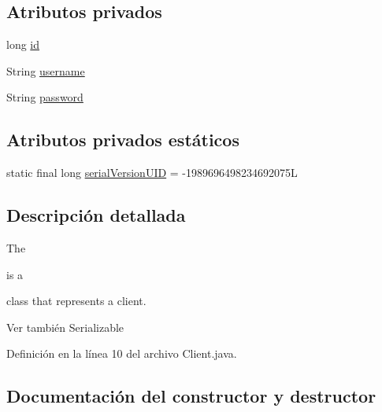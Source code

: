 \subsection*{Atributos privados}
\begin{DoxyCompactItemize}
\item 
long \mbox{\hyperlink{classcom_1_1ruralhousejsf_1_1domain_1_1_client_ab353a203ee0d84148e34fbb27ff0dbb8}{id}}
\item 
String \mbox{\hyperlink{classcom_1_1ruralhousejsf_1_1domain_1_1_client_a0d105bbb8e72c4a5b70ec43f59227882}{username}}
\item 
String \mbox{\hyperlink{classcom_1_1ruralhousejsf_1_1domain_1_1_client_a1914bdf0282fd4a34b890a6fb775619e}{password}}
\end{DoxyCompactItemize}
\subsection*{Atributos privados estáticos}
\begin{DoxyCompactItemize}
\item 
static final long \mbox{\hyperlink{classcom_1_1ruralhousejsf_1_1domain_1_1_client_a6ac812041b6242509f710f231010ad7f}{serial\+Version\+U\+ID}} = -\/1989696498234692075L
\end{DoxyCompactItemize}


\subsection{Descripción detallada}
The
\begin{DoxyCode}{0}
\end{DoxyCode}
 is a
\begin{DoxyCode}{0}
\end{DoxyCode}
 class that represents a client.

\begin{DoxySeeAlso}{Ver también}
Serializable 
\end{DoxySeeAlso}


Definición en la línea 10 del archivo Client.\+java.



\subsection{Documentación del constructor y destructor}
\mbox{\label{classcom_1_1ruralhousejsf_1_1domain_1_1_client_a351f5095f2aa19b4b43bd39c069d7e43}} 
